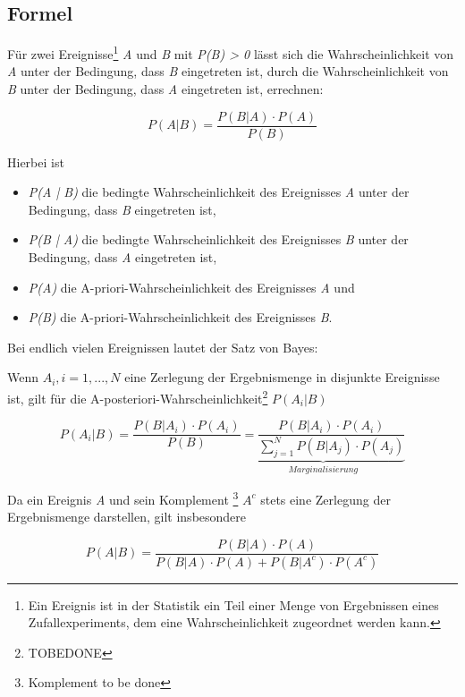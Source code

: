 \subsection{Formel}

Für zwei Ereignisse\footnote{Ein Ereignis ist in der Statistik ein Teil einer Menge von Ergebnissen eines Zufallexperiments, dem eine Wahrscheinlichkeit zugeordnet
    werden kann.} \textit{A} und \textit{B} mit \textit{P(B) > 0} lässt sich die Wahrscheinlichkeit von \textit{A} unter der Bedingung, dass \textit{B} eingetreten
ist, durch die Wahrscheinlichkeit von \textit{B} unter der Bedingung, dass \textit{A} eingetreten ist, errechnen:

\begin{equation}
    P(A | B) = \frac{P(B | A) \cdot P(A)}{P(B)}
\end{equation}

Hierbei ist

\begin{itemize}
    \item \textit{P(A | B)} die bedingte Wahrscheinlichkeit des Ereignisses \textit{A} unter der Bedingung, dass \textit{B} eingetreten ist,
    \item \textit{P(B | A)} die bedingte Wahrscheinlichkeit des Ereignisses \textit{B} unter der Bedingung, dass \textit{A} eingetreten ist,
    \item \textit{P(A)} die A-priori-Wahrscheinlichkeit des Ereignisses \textit{A} und
    \item \textit{P(B)} die A-priori-Wahrscheinlichkeit des Ereignisses \textit{B}.
\end{itemize}

Bei endlich vielen Ereignissen lautet der Satz von Bayes:

Wenn \textit{$A_i, i = 1,..., N$} eine Zerlegung der Ergebnismenge in disjunkte Ereignisse ist, gilt für die A-posteriori-Wahrscheinlichkeit\footnote{TOBEDONE}
\textit{$P(A_i | B)$}

\begin{equation} \label{equ:bayes}
    P(A_i | B) = \frac{P(B | A_i) \cdot P(A_i)}{P(B)} \underbrace{= \frac{P(B | A_i) \cdot P(A_i)}{\sum_{j = 1}^{N} P(B | A_j) \cdot P(A_j)}}_{Marginalisierung}
\end{equation}

Da ein Ereignis \textit{A} und sein Komplement \footnote{Komplement to be done} \textit{$A^c$} stets eine Zerlegung der Ergebnismenge darstellen, gilt insbesondere

\begin{equation}
    P(A | B) = \frac{P(B | A) \cdot P(A)}{P(B | A) \cdot P(A) + P(B | A^c) \cdot P(A^c)}
\end{equation}

\cite[S.411f]{Papula:2014}
